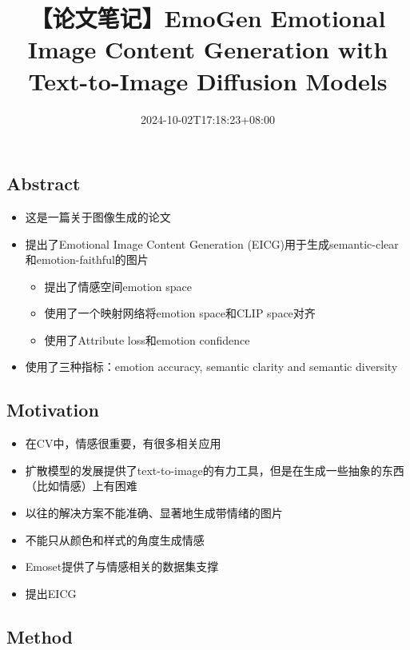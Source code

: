 \documentclass[
]{article}
\title{【论文笔记】EmoGen Emotional Image Content Generation with
Text-to-Image Diffusion Models}
\author{}
\date{2024-10-02T17:18:23+08:00}
\providecommand{\tightlist}{%
  \setlength{\itemsep}{0pt}\setlength{\parskip}{0pt}}
\begin{document}
\maketitle
{
\setcounter{tocdepth}{3}
\tableofcontents
}
\hypertarget{abstract}{%
\subsection{Abstract}\label{abstract}}

\begin{itemize}
\tightlist
\item
  这是一篇关于图像生成的论文
\item
  提出了Emotional Image Content Generation
  (EICG)用于生成semantic-clear和emotion-faithful的图片

  \begin{itemize}
  \tightlist
  \item
    提出了情感空间emotion space
  \item
    使用了一个映射网络将emotion space和CLIP space对齐
  \item
    使用了Attribute loss和emotion confidence
  \end{itemize}
\item
  使用了三种指标：emotion accuracy, semantic clarity and semantic
  diversity
\end{itemize}

\hypertarget{motivation}{%
\subsection{Motivation}\label{motivation}}

\begin{itemize}
\tightlist
\item
  在CV中，情感很重要，有很多相关应用
\item
  扩散模型的发展提供了text-to-image的有力工具，但是在生成一些抽象的东西（比如情感）上有困难
\item
  以往的解决方案不能准确、显著地生成带情绪的图片
\item
  不能只从颜色和样式的角度生成情感
\item
  Emoset提供了与情感相关的数据集支撑
\item
  提出EICG
\end{itemize}

\hypertarget{method}{%
\subsection{Method}\label{method}}
\end{document}
